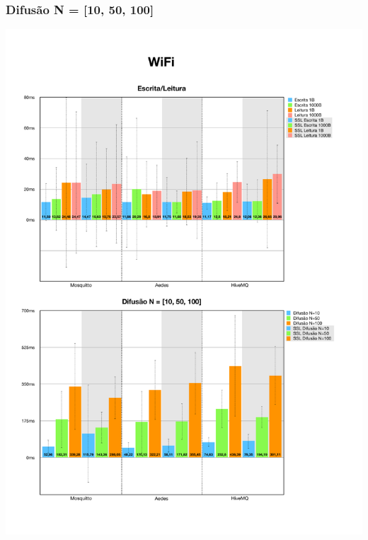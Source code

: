 \documentclass[12pt,a4paper]{article}
\begin{document}
\subsubsection{Difusão N = [10, 50, 100]}
\begin{center}
\includegraphics[width=1.0\textwidth]{wifi_spread1.pdf}
\end{center}
\end{document}
